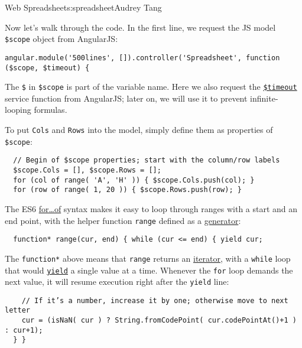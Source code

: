 \begin{aosachapter}{Web Spreadsheet}{s:spreadsheet}{Audrey Tang}

Now let's walk through the code. In the first line, we request the JS
model \texttt{\$scope} object from AngularJS:

\begin{verbatim}
angular.module('500lines', []).controller('Spreadsheet', function ($scope, $timeout) {
\end{verbatim}

The \texttt{\$} in \texttt{\$scope} is part of the variable name. Here
we also request the
\href{https://docs.angularjs.org/api/ng/service/\$timeout}{\texttt{\$timeout}}
service function from AngularJS; later on, we will use it to prevent
infinite-looping formulas.

To put \texttt{Cols} and \texttt{Rows} into the model, simply define
them as properties of \texttt{\$scope}:

\begin{verbatim}
  // Begin of $scope properties; start with the column/row labels
  $scope.Cols = [], $scope.Rows = [];
  for (col of range( 'A', 'H' )) { $scope.Cols.push(col); }
  for (row of range( 1, 20 )) { $scope.Rows.push(row); }
\end{verbatim}

The ES6
\href{https://developer.mozilla.org/en-US/docs/Web/JavaScript/Reference/Statements/for...of}{for\ldots{}of}
syntax makes it easy to loop through ranges with a start and an end
point, with the helper function \texttt{range} defined as a
\href{https://developer.mozilla.org/en-US/docs/Web/JavaScript/Reference/Statements/function*}{generator}:

\begin{verbatim}
  function* range(cur, end) { while (cur <= end) { yield cur;
\end{verbatim}

The \texttt{function*} above means that \texttt{range} returns an
\href{https://developer.mozilla.org/en-US/docs/Web/JavaScript/Guide/The_Iterator_protocol}{iterator},
with a \texttt{while} loop that would
\href{https://developer.mozilla.org/en-US/docs/Web/JavaScript/Reference/Operators/yield}{\texttt{yield}}
a single value at a time. Whenever the \texttt{for} loop demands the
next value, it will resume execution right after the \texttt{yield}
line:

\begin{verbatim}
    // If it’s a number, increase it by one; otherwise move to next letter
    cur = (isNaN( cur ) ? String.fromCodePoint( cur.codePointAt()+1 ) : cur+1);
  } }
\end{verbatim}


\end{aosachapter}
